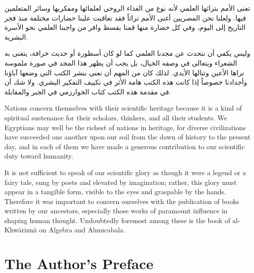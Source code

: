 \documentclass[11pt,a4paper,openany,oneside]{book}
\begin{document}
\begin{arabicbox}
\begin{Arabic}
تعنى الأمم بتراثها العلمي لأنه نوع من الغذاء الروحي لعلمائها ومفكريها
وسائر المتعلمين فيها. ولعلنا نحن المصريين أغنى الأمم تراثاً فقد تعاقبت
علينا حضارات مختلفة منذ فجر التاريخ إلى اليوم، وفي كل حضارة منها قمنا
بقسط وافر من واجبنا العلمي نحو الأسرة البشرية.

وليس يكفي أن نتحدث عن مجدنا العلمي كما لو كان أسطورة أو حديث خرافة،
يتغنى به الشعراء ويتعالى في وصفه الخيال، بل يجب أن يظهر هذا المجد في
صورة ملموسة تراها الأعين وتنالها الأيدي. لذلك كان من المهم أن نعنى
بنشر الكتب التي وضعها آباؤنا وأجدادنا خصوصاً إذا كانت هذه الكتب
هامة الأثر في تكييف التفكير البشري. ولا شك أن في مقدمة هذه الكتب
كتاب الخوارزمي في الجبر والمقابلة.
\end{Arabic}
\end{arabicbox}

\vspace{0.5cm}

\begin{small}
Nations concern themselves with their scientific heritage because it is a kind
of spiritual sustenance for their scholars, thinkers, and all their students.
We Egyptians may well be the richest of nations in heritage, for diverse
civilizations have succeeded one another upon our soil from the dawn of
history to the present day, and in each of them we have made a generous
contribution to our scientific duty toward humanity.

It is not sufficient to speak of our scientific glory as though it were a
legend or a fairy tale, sung by poets and elevated by imagination; rather,
this glory must appear in a tangible form, visible to the eyes and graspable
by the hands. Therefore it was important to concern ourselves with the
publication of books written by our ancestors, especially those works of
paramount influence in shaping human thought. Undoubtedly foremost among
these is the book of al-Khw\=arizm\"{\i} on Algebra and Almucabala.
\end{small}

\newpage

\chapter*{The Author's Preface}
\end{document}
